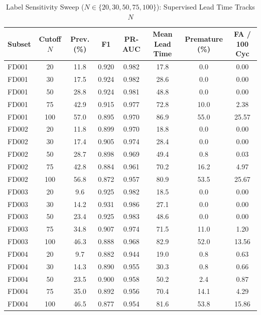 \begin{table}[t!]
\centering
\small
\caption{Label Sensitivity Sweep ($N \in \{20, 30, 50, 75, 100\}$): Supervised Lead Time Tracks $N$}
\label{tab:label_sensitivity_sweep}
\begin{tabular}{lccccccc}
\toprule
\textbf{Subset} & \textbf{Cutoff $N$} & \textbf{Prev. (\%)} & \textbf{F1} & \textbf{PR-AUC} & \textbf{Mean Lead Time} & \textbf{Premature (\%)} & \textbf{FA / 100 Cyc} \\
\midrule
FD001 & 20 & 11.8 & 0.920 & 0.982 & 17.8 & 0.0 & 0.00 \\
FD001 & 30 & 17.5 & 0.924 & 0.982 & 28.6 & 0.0 & 0.00 \\
FD001 & 50 & 28.8 & 0.924 & 0.981 & 48.8 & 0.0 & 0.00 \\
FD001 & 75 & 42.9 & 0.915 & 0.977 & 72.8 & 10.0 & 2.38 \\
FD001 & 100 & 57.0 & 0.895 & 0.970 & 86.9 & 55.0 & 25.57 \\
\midrule
FD002 & 20 & 11.8 & 0.899 & 0.970 & 18.8 & 0.0 & 0.00 \\
FD002 & 30 & 17.4 & 0.905 & 0.974 & 28.4 & 0.0 & 0.00 \\
FD002 & 50 & 28.7 & 0.898 & 0.969 & 49.4 & 0.8 & 0.03 \\
FD002 & 75 & 42.8 & 0.884 & 0.961 & 70.2 & 16.2 & 4.97 \\
FD002 & 100 & 56.8 & 0.872 & 0.957 & 80.9 & 53.5 & 25.67 \\
\midrule
FD003 & 20 & 9.6 & 0.925 & 0.982 & 18.5 & 0.0 & 0.00 \\
FD003 & 30 & 14.2 & 0.931 & 0.986 & 27.1 & 0.0 & 0.00 \\
FD003 & 50 & 23.4 & 0.925 & 0.983 & 48.6 & 0.0 & 0.00 \\
FD003 & 75 & 34.8 & 0.907 & 0.974 & 71.5 & 11.0 & 1.20 \\
FD003 & 100 & 46.3 & 0.888 & 0.968 & 82.9 & 52.0 & 13.56 \\
\midrule
FD004 & 20 & 9.7 & 0.882 & 0.944 & 19.0 & 0.8 & 0.63 \\
FD004 & 30 & 14.3 & 0.890 & 0.955 & 30.3 & 0.8 & 0.66 \\
FD004 & 50 & 23.5 & 0.900 & 0.958 & 50.2 & 2.4 & 0.87 \\
FD004 & 75 & 35.0 & 0.892 & 0.956 & 70.4 & 14.1 & 4.29 \\
FD004 & 100 & 46.5 & 0.877 & 0.954 & 81.6 & 53.8 & 15.86 \\
\bottomrule
\end{tabular}
\end{table}


